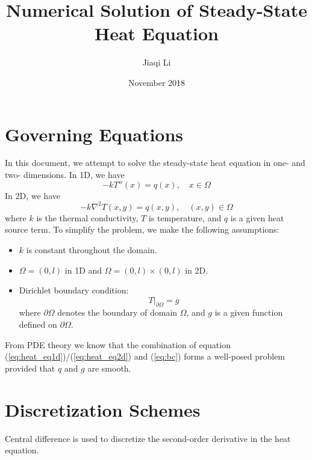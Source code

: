 \documentclass{article}
\title{Numerical Solution of Steady-State Heat Equation}
\author{Jiaqi Li}
\date{November 2018}
\begin{document}
\maketitle

\section{Governing Equations}

In this document, we attempt to solve the steady-state heat equation in one- and two- dimensions.
In 1D, we have
\begin{equation} \label{eq:heat_eq1d}
    -kT''(x) = q(x),\quad x \in \Omega
\end{equation}
In 2D, we have
\begin{equation} \label{eq:heat_eq2d}
    -k \nabla^2 T(x,y) = q(x,y),\quad (x,y) \in \Omega
\end{equation}
where $k$ is the thermal conductivity, $T$ is temperature, and $q$ is a given heat source term. To simplify the problem, we make the following 
assumptions:
\begin{itemize}
    \item $k$ is constant throughout the domain.
    \item $\Omega = (0,l)$ in 1D and $\Omega = (0, l) \times (0, l)$ in 2D.
    \item Dirichlet boundary condition:
        \begin{equation} \label{eq:bc}
            T|_{\partial \Omega} = g
        \end{equation}
        where $\partial \Omega$ denotes the boundary of domain $\Omega$, and $g$ is a given function defined on $\partial \Omega$.
\end{itemize}
From PDE theory we know that the combination of equation (\ref{eq:heat_eq1d})/(\ref{eq:heat_eq2d}) and (\ref{eq:bc}) forms a well-posed problem provided that $q$ and $g$ are smooth.


\section{Discretization Schemes}
Central difference is used to discretize the second-order derivative in the heat equation. 
\end{document}
